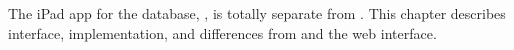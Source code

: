The iPad app for the \pathcasekegg database, \keggapp, is totally separate from
\mawapp. This chapter describes \keggappp interface, implementation, and
differences from \mawapp and the \pathcasekegg web interface.








